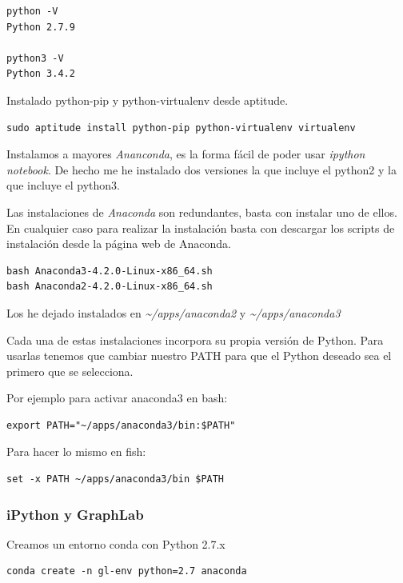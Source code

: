 \documentclass[12pt,spanish,]{article}
\begin{document}
\begin{verbatim}
python -V
Python 2.7.9

python3 -V
Python 3.4.2
\end{verbatim}

Instalado python-pip y python-virtualenv desde aptitude.

\begin{verbatim}
sudo aptitude install python-pip python-virtualenv virtualenv
\end{verbatim}

Instalamos a mayores \emph{Ananconda}, es la forma fácil de poder usar
\emph{ipython notebook}. De hecho me he instalado dos versiones la que
incluye el python2 y la que incluye el python3.

Las instalaciones de \emph{Anaconda} son redundantes, basta con instalar
uno de ellos. En cualquier caso para realizar la instalación basta con
descargar los scripts de instalación desde la página web de Anaconda.

\begin{verbatim}
bash Anaconda3-4.2.0-Linux-x86_64.sh
bash Anaconda2-4.2.0-Linux-x86_64.sh
\end{verbatim}

Los he dejado instalados en \emph{\textasciitilde{}/apps/anaconda2} y
\emph{\textasciitilde{}/apps/anaconda3}

Cada una de estas instalaciones incorpora su propia versión de Python.
Para usarlas tenemos que cambiar nuestro PATH para que el Python deseado
sea el primero que se selecciona.

Por ejemplo para activar anaconda3 en bash:

\begin{verbatim}
export PATH="~/apps/anaconda3/bin:$PATH"
\end{verbatim}

Para hacer lo mismo en fish:

\begin{verbatim}
set -x PATH ~/apps/anaconda3/bin $PATH
\end{verbatim}

\subsubsection{iPython y GraphLab}\label{ipython-y-graphlab}

Creamos un entorno conda con Python 2.7.x

\begin{verbatim}
conda create -n gl-env python=2.7 anaconda
\end{verbatim}
\end{document}
